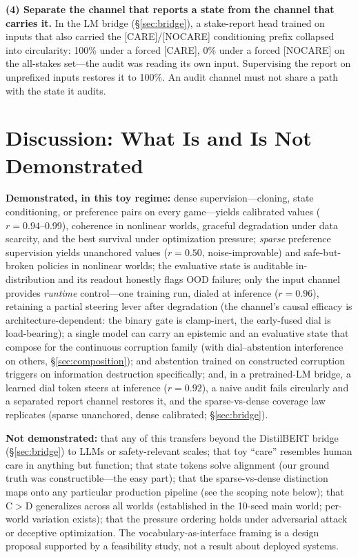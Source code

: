 \documentclass[manuscript, screen, review]{jair}
\begin{document}
\textbf{(4) Separate the channel that reports a state from the channel that carries it.}
In the LM bridge (\S\ref{sec:bridge}), a stake-report head trained on inputs that also
carried the [CARE]/[NOCARE] conditioning prefix collapsed into circularity: 100\% under a
forced [CARE], 0\% under a forced [NOCARE] on the all-stakes set---the audit was reading
its own input. Supervising the report on unprefixed inputs restores it to 100\%. An audit
channel must not share a path with the state it audits.

\section{Discussion: What Is and Is Not Demonstrated}
\label{sec:discussion}

\textbf{Demonstrated, in this toy regime:} dense supervision---cloning, state conditioning, or preference pairs on every game---yields calibrated values ($r{=}0.94$--0.99), coherence in nonlinear worlds, graceful degradation under data scarcity, and the best survival under optimization pressure; \emph{sparse} preference supervision yields unanchored values ($r{=}0.50$, noise-improvable) and safe-but-broken policies in nonlinear worlds; the evaluative state is auditable in-distribution and its readout honestly flags OOD failure; only the input channel provides \emph{runtime} control---one training run, dialed at inference ($r{=}0.96$), retaining a partial steering lever after degradation (the channel's causal efficacy is architecture-dependent: the binary gate is clamp-inert, the early-fused dial is load-bearing); a single model can carry an epistemic and an evaluative state that compose for the continuous corruption family (with dial--abstention interference on others, \S\ref{sec:composition}); and abstention trained on constructed corruption triggers on information destruction specifically; and, in a pretrained-LM bridge, a learned dial token steers at inference ($r{=}0.92$), a naive audit fails circularly and a separated report channel restores it, and the sparse-vs-dense coverage law replicates (sparse unanchored, dense calibrated; \S\ref{sec:bridge}).

\textbf{Not demonstrated:} that any of this transfers beyond the DistilBERT bridge (\S\ref{sec:bridge}) to LLMs or safety-relevant scales; that toy ``care'' resembles human care in anything but function; that state tokens solve alignment (our ground truth was constructible---the easy part); that the sparse-vs-dense distinction maps onto any particular production pipeline (see the scoping note below); that C$>$D generalizes across all worlds (established in the 10-seed main world; per-world variation exists); that the pressure ordering holds under adversarial attack or deceptive optimization. The vocabulary-as-interface framing is a design proposal supported by a feasibility study, not a result about deployed systems.
\end{document}
